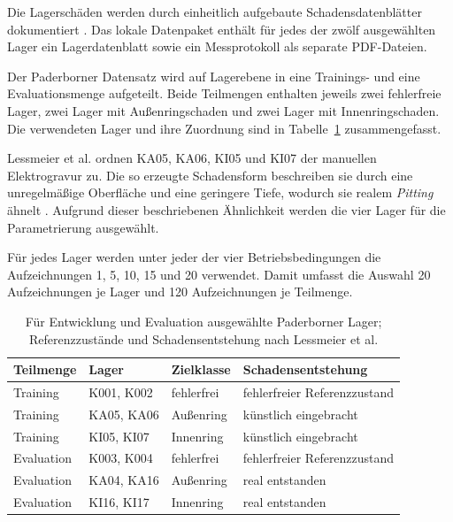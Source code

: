 Die Lagerschäden werden durch einheitlich aufgebaute Schadensdatenblätter
dokumentiert
\cite[S.~9, Abschn.~5]{lessmeierConditionMonitoringBearing2016}.
Das lokale Datenpaket enthält für jedes der zwölf ausgewählten Lager ein
Lagerdatenblatt sowie ein Messprotokoll als separate PDF-Dateien.


Der Paderborner Datensatz wird auf Lagerebene in eine Trainings- und eine
Evaluationsmenge aufgeteilt. Beide Teilmengen enthalten jeweils zwei
fehlerfreie Lager, zwei Lager mit Außenringschaden und zwei Lager mit
Innenringschaden. Die verwendeten Lager und ihre Zuordnung sind in
Tabelle~\ref{tab:paderborn_auswahl} zusammengefasst.

Lessmeier et al. ordnen KA05, KA06, KI05 und KI07 der manuellen
Elektrogravur zu. Die so erzeugte Schadensform beschreiben sie durch eine
unregelmäßige Oberfläche und eine geringere Tiefe, wodurch sie realem \emph{Pitting} ähnelt
\cite[S.~5, Abschn.~3.1 und Tab.~4]
{lessmeierConditionMonitoringBearing2016}. Aufgrund dieser beschriebenen
Ähnlichkeit werden die vier Lager für die Parametrierung ausgewählt.

\begin{samepage}
Für jedes Lager werden unter jeder der vier Betriebsbedingungen die
Aufzeichnungen 1, 5, 10, 15 und 20 verwendet. Damit umfasst die Auswahl
20 Aufzeichnungen je Lager und 120 Aufzeichnungen je Teilmenge.

\end{samepage}

\begin{table}[H]
  \centering
  \caption{Für Entwicklung und Evaluation ausgewählte Paderborner Lager;
  Referenzzustände und Schadensentstehung nach Lessmeier et al.
  \cite[S.~5--6, Tab.~4--5; S.~8, Tab.~7]
  {lessmeierConditionMonitoringBearing2016}}
  \label{tab:paderborn_auswahl}
  \small
  \setlength{\aboverulesep}{0pt}
  \setlength{\belowrulesep}{0pt}
  \setlength{\doublerulesep}{0pt}
  \renewcommand{\arraystretch}{1.25}
  \begin{tabularx}{\textwidth}{|
    >{\raggedright\arraybackslash}p{2.0cm}|
    >{\raggedright\arraybackslash}p{2.1cm}|
    >{\raggedright\arraybackslash}p{2.4cm}|
    >{\raggedright\arraybackslash}X|}
    \hline
    \textbf{Teilmenge} & \textbf{Lager} & \textbf{Zielklasse} &
    \textbf{Schadensentstehung} \\
    \toprule
    \toprule
    Training & K001, K002 & fehlerfrei & fehlerfreier Referenzzustand \\
    \hline
    Training & KA05, KA06 & Außenring & künstlich eingebracht \\
    \hline
    Training & KI05, KI07 & Innenring & künstlich eingebracht \\
    \hline
    Evaluation & K003, K004 & fehlerfrei & fehlerfreier Referenzzustand \\
    \hline
    Evaluation & KA04, KA16 & Außenring & real entstanden \\
    \hline
    Evaluation & KI16, KI17 & Innenring & real entstanden \\
    \hline
  \end{tabularx}
\end{table}

